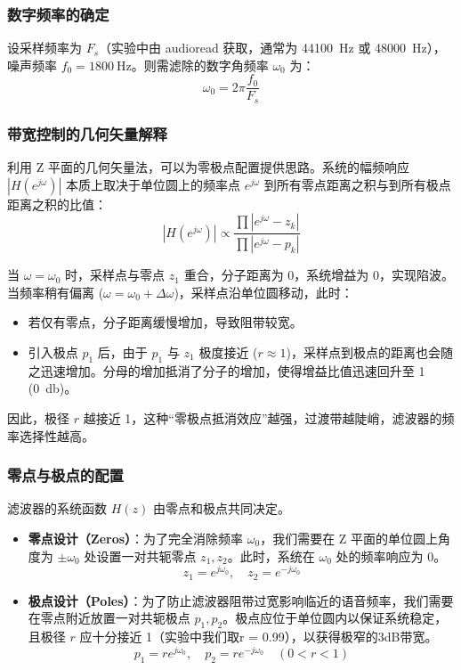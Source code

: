 \documentclass[12pt]{ctexart}
\begin{document}
\subsubsection{数字频率的确定}
设采样频率为 $F_s$（实验中由 audioread 获取，通常为 \SI{44100}{\hertz} 或 \SI{48000}{\hertz}），噪声频率 $f_0 = \SI{1800}{\hertz}$。则需滤除的数字角频率 $\omega_0$ 为：
\begin{equation}
    \omega_0 = 2\pi \frac{f_0}{F_s}
\end{equation}

\subsubsection{带宽控制的几何矢量解释}
利用 Z 平面的几何矢量法，可以为零极点配置提供思路。系统的幅频响应 $|H(e^{j\omega})|$ 本质上取决于单位圆上的频率点 $e^{j\omega}$ 到所有零点距离之积与到所有极点距离之积的比值：
\begin{equation}
    |H(e^{j\omega})| \propto \frac{\prod |e^{j\omega} - z_k|}{\prod |e^{j\omega} - p_k|}
\end{equation}

当 $\omega = \omega_0$ 时，采样点与零点 $z_1$ 重合，分子距离为 0，系统增益为 0，实现陷波。
当频率稍有偏离 ($\omega = \omega_0 + \Delta\omega$)，采样点沿单位圆移动，此时：
\begin{itemize}
    \item 若仅有零点，分子距离缓慢增加，导致阻带较宽。
    \item 引入极点 $p_1$ 后，由于 $p_1$ 与 $z_1$ 极度接近 ($r \approx 1$)，采样点到极点的距离也会随之迅速增加。分母的增加抵消了分子的增加，使得增益比值迅速回升至 1 (\SI{0}{\decibel})。
\end{itemize}
因此，极径 $r$ 越接近 1，这种“零极点抵消效应”越强，过渡带越陡峭，滤波器的频率选择性越高。

\subsubsection{零点与极点的配置}
滤波器的系统函数 $H(z)$ 由零点和极点共同决定。
\begin{itemize}
    \item \textbf{零点设计（Zeros）}：为了完全消除频率 $\omega_0$，我们需要在 Z 平面的单位圆上角度为 $\pm \omega_0$ 处设置一对共轭零点 $z_1, z_2$。此时，系统在 $\omega_0$ 处的频率响应为 0。
    \begin{equation}
        z_1 = e^{j\omega_0}, \quad z_2 = e^{-j\omega_0}
    \end{equation}
    
    \item \textbf{极点设计（Poles）}：为了防止滤波器阻带过宽影响临近的语音频率，我们需要在零点附近放置一对共轭极点 $p_1, p_2$。极点应位于单位圆内以保证系统稳定，且极径 $r$ 应十分接近 1（实验中我们取r = 0.99），以获得极窄的3dB带宽。
    \begin{equation}
        p_1 = r e^{j\omega_0}, \quad p_2 = r e^{-j\omega_0} \quad (0 < r < 1)
    \end{equation}
\end{itemize}
\end{document}
